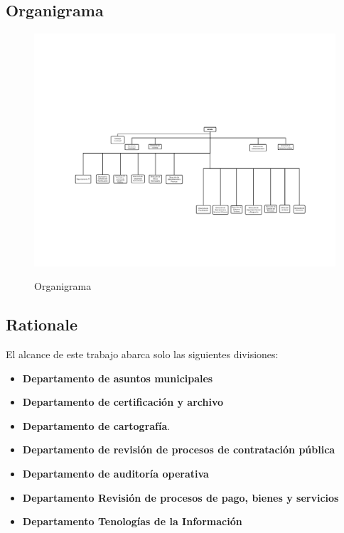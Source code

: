 
\subsection{Organigrama}

\begin{figure}[H]
	\centering
	\includegraphics[width=1\textwidth]{fragments/01structure/organigramaMunicipalidad.pdf}\\
\caption{Organigrama}
\label{FIG:ORGANIGRAMA}
\end{figure}


\subsection{Rationale}
El alcance de este trabajo abarca solo las siguientes divisiones:
\begin{itemize}
	\item {
		\textbf{Departamento de asuntos municipales}
	}
	\item {
		\textbf{Departamento de certificación y archivo}
	}
	\item {
		\textbf{Departamento de cartografía}.
	}
	\item {
		\textbf{Departamento de revisión de procesos de contratación pública}
	}
	\item {
		\textbf{Departamento de auditoría operativa}
	}
	\item {
		\textbf{Departamento Revisión de procesos de pago, bienes y servicios}
	}
	\item {
		\textbf{Departamento Tenologías de la Información}
	}
\end{itemize}

